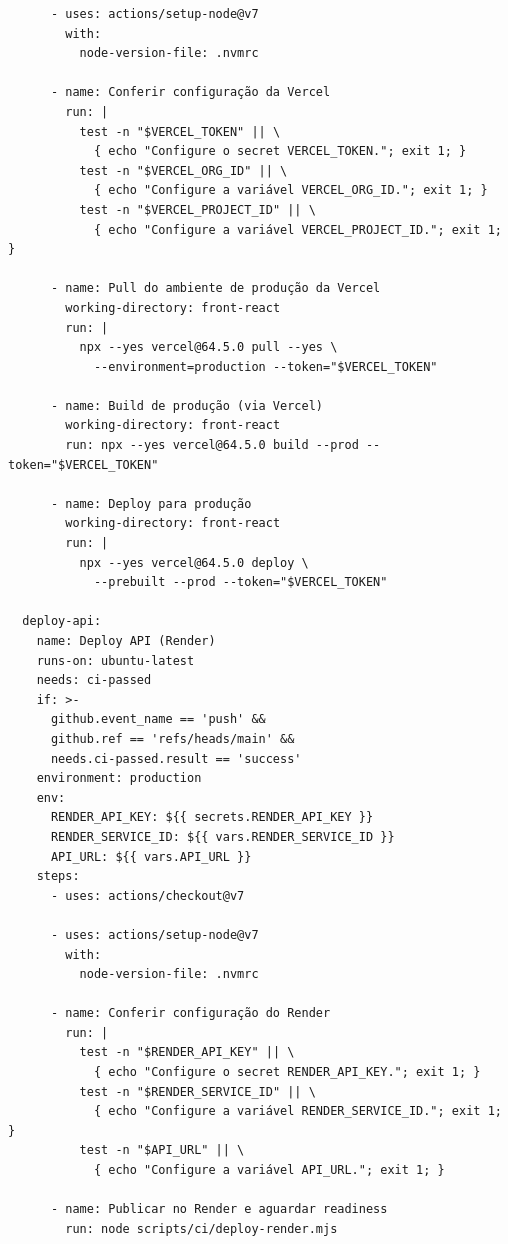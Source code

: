 \documentclass[11pt,a4paper]{article}
\begin{document}
\begin{verbatim}
      - uses: actions/setup-node@v7
        with:
          node-version-file: .nvmrc

      - name: Conferir configuração da Vercel
        run: |
          test -n "$VERCEL_TOKEN" || \
            { echo "Configure o secret VERCEL_TOKEN."; exit 1; }
          test -n "$VERCEL_ORG_ID" || \
            { echo "Configure a variável VERCEL_ORG_ID."; exit 1; }
          test -n "$VERCEL_PROJECT_ID" || \
            { echo "Configure a variável VERCEL_PROJECT_ID."; exit 1; }

      - name: Pull do ambiente de produção da Vercel
        working-directory: front-react
        run: |
          npx --yes vercel@64.5.0 pull --yes \
            --environment=production --token="$VERCEL_TOKEN"

      - name: Build de produção (via Vercel)
        working-directory: front-react
        run: npx --yes vercel@64.5.0 build --prod --token="$VERCEL_TOKEN"

      - name: Deploy para produção
        working-directory: front-react
        run: |
          npx --yes vercel@64.5.0 deploy \
            --prebuilt --prod --token="$VERCEL_TOKEN"

  deploy-api:
    name: Deploy API (Render)
    runs-on: ubuntu-latest
    needs: ci-passed
    if: >-
      github.event_name == 'push' &&
      github.ref == 'refs/heads/main' &&
      needs.ci-passed.result == 'success'
    environment: production
    env:
      RENDER_API_KEY: ${{ secrets.RENDER_API_KEY }}
      RENDER_SERVICE_ID: ${{ vars.RENDER_SERVICE_ID }}
      API_URL: ${{ vars.API_URL }}
    steps:
      - uses: actions/checkout@v7

      - uses: actions/setup-node@v7
        with:
          node-version-file: .nvmrc

      - name: Conferir configuração do Render
        run: |
          test -n "$RENDER_API_KEY" || \
            { echo "Configure o secret RENDER_API_KEY."; exit 1; }
          test -n "$RENDER_SERVICE_ID" || \
            { echo "Configure a variável RENDER_SERVICE_ID."; exit 1; }
          test -n "$API_URL" || \
            { echo "Configure a variável API_URL."; exit 1; }

      - name: Publicar no Render e aguardar readiness
        run: node scripts/ci/deploy-render.mjs
\end{verbatim}
\end{document}
